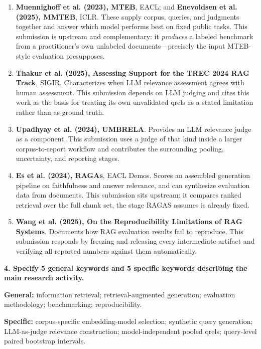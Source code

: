 \documentclass[10pt,a4paper]{article}
\newcommand{\q}[1]{\medskip\noindent\textbf{#1}\par\nopagebreak}
\begin{document}
\begin{enumerate}
  \item \textbf{Muennighoff et al. (2023), MTEB}, EACL; and \textbf{Enevoldsen et al. (2025),
        MMTEB}, ICLR. These supply corpus, queries, and judgments together and answer which
        model performs best on fixed public tasks. This submission is upstream and
        complementary: it \emph{produces} a labeled benchmark from a practitioner's own
        unlabeled documents---precisely the input MTEB-style evaluation presupposes.
  \item \textbf{Thakur et al. (2025), Assessing Support for the TREC 2024 RAG Track}, SIGIR.
        Characterizes when LLM relevance assessment agrees with human assessment. This
        submission depends on LLM judging and cites this work as the basis for treating its own
        unvalidated qrels as a stated limitation rather than as ground truth.
  \item \textbf{Upadhyay et al. (2024), UMBRELA}. Provides an LLM relevance judge as a
        component. This submission uses a judge of that kind inside a larger corpus-to-report
        workflow and contributes the surrounding pooling, uncertainty, and reporting stages.
  \item \textbf{Es et al. (2024), RAGAs}, EACL Demos. Scores an assembled generation pipeline on
        faithfulness and answer relevance, and can synthesize evaluation data from documents.
        This submission sits upstream: it compares ranked retrieval over the full chunk set, the
        stage RAGAS assumes is already fixed.
  \item \textbf{Wang et al. (2025), On the Reproducibility Limitations of RAG Systems}.
        Documents how RAG evaluation results fail to reproduce. This submission responds by
        freezing and releasing every intermediate artifact and verifying all reported numbers
        against them automatically.
\end{enumerate}

\q{4. Specify 5 general keywords and 5 specific keywords describing the main research activity.}

\textbf{General:} information retrieval; retrieval-augmented generation; evaluation
methodology; benchmarking; reproducibility.

\textbf{Specific:} corpus-specific embedding-model selection; synthetic query generation;
LLM-as-judge relevance construction; model-independent pooled qrels; query-level paired
bootstrap intervals.
\end{document}
